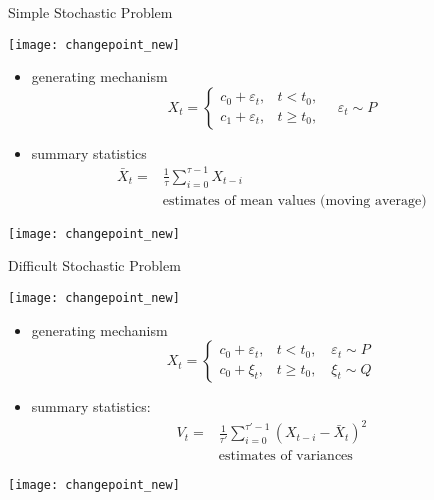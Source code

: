 \documentclass[fleqn,aspectratio=1610]{beamer}
\begin{document}
\begin{frame}[label={sec:org9b34574},t]{Simple Stochastic Problem}
\begin{center}
\texttt{[image: changepoint\_new]}
\end{center}
\begin{overprint}
\begin{itemize}
\item generating mechanism
\begin{equation}
  X_{t}=
  \begin{cases}
    c_{0}+\varepsilon_{t},&t<t_{0},\\
    c_{1}+\varepsilon_{t},&t\geq t_{0},
  \end{cases}
  \quad \varepsilon_{t}\sim P
\end{equation}
\end{itemize}
\begin{itemize}
\item summary statistics
\begin{align}
  \bar{X}_{t}=
  &\frac{1}{\tau}\sum_{i=0}^{\tau-1}X_{t-i}\\
  &\text{estimates of mean values (moving average)}
\end{align}
\end{itemize}
\begin{center}
\texttt{[image: changepoint\_new]}      
\end{center}
\end{overprint}
\end{frame}

\begin{frame}[label={sec:org345c3d2},t]{Difficult Stochastic Problem}
\begin{center}
\texttt{[image: changepoint\_new]}
\end{center}
\begin{overprint}
\begin{itemize}
\item generating mechanism
\begin{equation}
  X_{t}=
  \begin{cases}
    c_{0}+\varepsilon_{t},&t<t_{0}, \quad \varepsilon_{t}\sim P\\
    c_{0}+\xi_{t},&t\geq t_{0}, \quad \xi_{t}\sim Q
  \end{cases}
\end{equation}
\end{itemize}
\begin{itemize}
\item summary statistics:
\begin{align}
  V_{t}=
  &\frac{1}{\tau'}\sum_{i=0}^{\tau'-1}(X_{t-i}-\bar{X}_{t})^{2}\\
  &\text{estimates of variances}
\end{align}
\end{itemize}
\begin{center}
\texttt{[image: changepoint\_new]}      
\end{center}
\end{overprint}
\end{frame}
\end{document}
